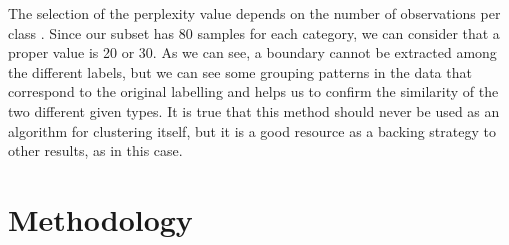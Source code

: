 	
	The selection of the perplexity value depends on the number of observations per class \cite{Wattenberg2016}. Since our subset has 80 samples for each category, we can consider that a proper value is 20 or 30. As we can see, a boundary cannot be extracted among the different labels, but we can see some grouping patterns in the data that correspond to the original labelling and helps us to confirm the similarity of the two different given types. It is true that this method should never be used as an algorithm for clustering itself, but it is a good resource as a backing strategy to other results, as in this case. 
	
\section{Methodology}
\label{section:models}


	
	
	
		
	
	
	
	
	

	
	
	
	
	

	
	
	

	
	
	
	
	
	
	
	
	